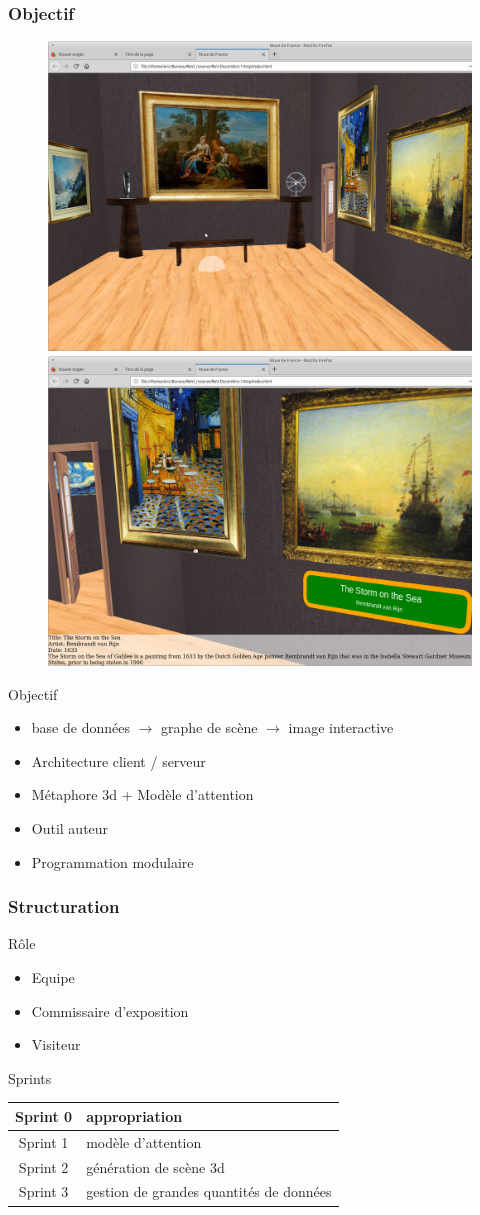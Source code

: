 \documentclass[11pt]{beamer}
\begin{document}
\begin{frame}
\frametitle{Objectif}
\begin{block}{}
	\begin{figure}
		\centering
		\includegraphics[width=0.45\linewidth]{ima2.jpg}
		\includegraphics[width=0.45\linewidth]{ima1.jpg}

	\end{figure}
	
\end{block}
\begin{block}{Objectif}
	\begin{itemize}
		\item base de données $\rightarrow$ graphe de scène $\rightarrow$ image interactive
		\item Architecture client / serveur 
		\item Métaphore 3d + Modèle d'attention
		\item Outil auteur 
		\item Programmation modulaire
	\end{itemize}
\end{block}
\end{frame}

\begin{frame}
\frametitle{Structuration}
\begin{block}{Rôle}
	\begin{itemize}
		\item Equipe 
		\item Commissaire d'exposition 
		\item Visiteur 
	\end{itemize}
\end{block}
\begin{block}{Sprints}
	\centering
\begin{tabular}{|c|l|}
	\hline 
	Sprint 0 &  appropriation\\ 
	\hline 
	Sprint 1 &  modèle d'attention\\ 
	\hline 
	Sprint 2 &  génération de scène 3d\\ 
	\hline 
	Sprint 3 &  gestion de grandes quantités de données\\ 
	\hline 
\end{tabular} 
\end{block}
\end{frame}
\end{document}
